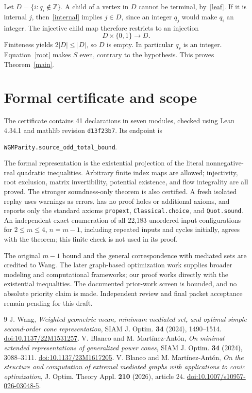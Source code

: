 \documentclass[11pt]{article}
\newcommand{\Z}{\mathbb Z}
\begin{document}
Let $D=\{i:q_i\notin\Z\}$. A child of a vertex in $D$ cannot be terminal,
by~\eqref{leaf}. If it is internal $j$, then~\eqref{internal} implies
$j\in D$, since an integer $q_j$ would make $q_i$ an integer. The injective
child map therefore restricts to an injection
\[
 D\times\{0,1\}\longrightarrow D.
\]
Finiteness yields $2|D|\le|D|$, so $D$ is empty. In particular $q_r$ is
an integer. Equation~\eqref{root} makes $S$ even, contrary to the
hypothesis. This proves Theorem~\ref{main}.

\section{Formal certificate and scope}
The certificate contains 41 declarations in seven modules, checked using
Lean 4.34.1 and mathlib revision \texttt{d13f23b7}. Its endpoint is
\begin{center}
\texttt{WGMParity.source\_odd\_total\_bound}.
\end{center}
The formal representation is the existential projection of the literal
nonnegative-real quadratic inequalities. Arbitrary finite index maps are
allowed; injectivity, root exclusion, matrix invertibility, potential
existence, and flow integrality are all proved. The stronger soundness-only
theorem is also certified. A fresh isolated replay uses warnings as errors,
has no proof holes or additional axioms, and reports only the standard
axioms \texttt{propext}, \texttt{Classical.choice}, and \texttt{Quot.sound}.
An independent exact enumeration of all 22,183 unordered input
configurations for $2\le m\le4$, $n=m-1$, including repeated inputs and
cycles initially, agrees with the theorem; this finite check is not used
in its proof.

The original $m-1$ bound and the general correspondence with mediated
sets are credited to Wang. The later graph-based optimization work
\cite{Blanco2024,Blanco2026} supplies broader modeling and computational
frameworks; our proof works directly with the existential inequalities.
The documented prior-work screen is bounded, and no absolute priority
claim is made. Independent review and final packet acceptance remain
pending for this draft.

\begin{thebibliography}{9}
 J. Wang, \emph{Weighted geometric mean, minimum mediated set,
and optimal simple second-order cone representation}, SIAM J. Optim.
\textbf{34} (2024), 1490--1514.
\href{https://doi.org/10.1137/22M1531257}{doi:10.1137/22M1531257}.
 V. Blanco and M. Mart\'inez-Ant\'on,
\emph{On minimal extended representations of generalized power cones},
SIAM J. Optim. \textbf{34} (2024), 3088--3111.
\href{https://doi.org/10.1137/23M1617205}{doi:10.1137/23M1617205}.
 V. Blanco and M. Mart\'inez-Ant\'on,
\emph{On the structure and computation of extremal mediated graphs with
applications to conic optimization}, J. Optim. Theory Appl.
\textbf{210} (2026), article 24.
\href{https://doi.org/10.1007/s10957-026-03048-5}{doi:10.1007/s10957-026-03048-5}.
\end{thebibliography}
\end{document}
